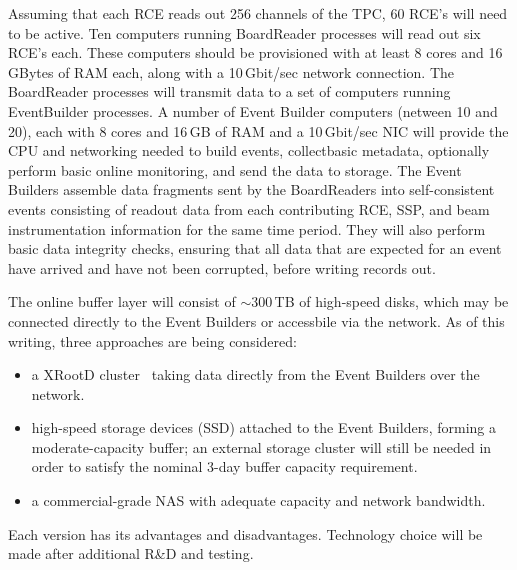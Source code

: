 Assuming that each RCE reads out 256 channels of the TPC, 60 RCE's
will need to be active.  Ten computers running BoardReader
processes will read out six RCE's each.  These computers should be
provisioned with at least 8 cores and 16 GBytes of RAM each, along
with a 10\,Gbit/sec network connection.  The BoardReader processes will
transmit data to a set of computers running EventBuilder processes.
A number of Event Builder computers (netween 10 and 20), each with 8 cores and 16\,GB of RAM
and a 10\,Gbit/sec NIC will provide the CPU and networking needed to
build events, collectbasic metadata, optionally perform basic online monitoring,
and send the data to storage.  The Event Builders assemble data fragments sent by the
BoardReaders into self-consistent events consisting of readout data
from each contributing RCE, SSP, and beam instrumentation information
for the same time period.  They will also perform basic data integrity
checks, ensuring that all data that are expected for an event have
arrived and have not been corrupted, before writing records out.

The online buffer layer will consist of $\sim$300\,TB of high-speed disks, which may be connected directly to the Event Builders
or accessbile via the network.  As of this writing, three approaches are being considered:
\begin{itemize}
\item a XRootD cluster~\cite{xrootd} taking data directly from the Event Builders over the network.

\item high-speed storage devices (SSD) attached to the Event Builders, forming a moderate-capacity buffer;
an external storage cluster will still be needed in order to satisfy the nominal 3-day buffer capacity requirement.

\item a commercial-grade NAS with adequate capacity and network bandwidth.

\end{itemize}

\noindent Each version has its advantages and disadvantages. Technology choice will be made after
additional R\&D and testing.


